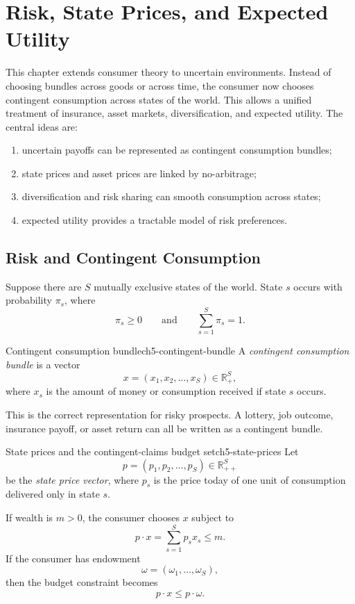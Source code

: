 
\section{Risk, State Prices, and Expected Utility}

This chapter extends consumer theory to uncertain environments. Instead of choosing bundles across goods or across time, the consumer now chooses contingent consumption across states of the world. This allows a unified treatment of insurance, asset markets, diversification, and expected utility. The central ideas are:
\begin{enumerate}
    \item uncertain payoffs can be represented as contingent consumption bundles;
    \item state prices and asset prices are linked by no-arbitrage;
    \item diversification and risk sharing can smooth consumption across states;
    \item expected utility provides a tractable model of risk preferences.
\end{enumerate}

\subsection{Risk and Contingent Consumption}

Suppose there are $S$ mutually exclusive states of the world. State $s$ occurs with probability $\pi_s$, where
\[
\pi_s \ge 0
\qquad \text{and} \qquad
\sum_{s=1}^S \pi_s = 1.
\]

\begin{definition}{Contingent consumption bundle}{ch5-contingent-bundle}
A \emph{contingent consumption bundle} is a vector
\[
x=(x_1,x_2,\dots,x_S)\in \mathbb{R}_+^S,
\]
where $x_s$ is the amount of money or consumption received if state $s$ occurs.
\end{definition}

This is the correct representation for risky prospects. A lottery, job outcome, insurance payoff, or asset return can all be written as a contingent bundle.

\begin{definition}{State prices and the contingent-claims budget set}{ch5-state-prices}
Let
\[
p=(p_1,p_2,\dots,p_S)\in \mathbb{R}_{++}^S
\]
be the \emph{state price vector}, where $p_s$ is the price today of one unit of consumption delivered only in state $s$.

If wealth is $m>0$, the consumer chooses $x$ subject to
\[
p\cdot x = \sum_{s=1}^S p_s x_s \le m.
\]
If the consumer has endowment
\[
\omega=(\omega_1,\dots,\omega_S),
\]
then the budget constraint becomes
\[
p\cdot x \le p\cdot \omega.
\]
\end{definition}


